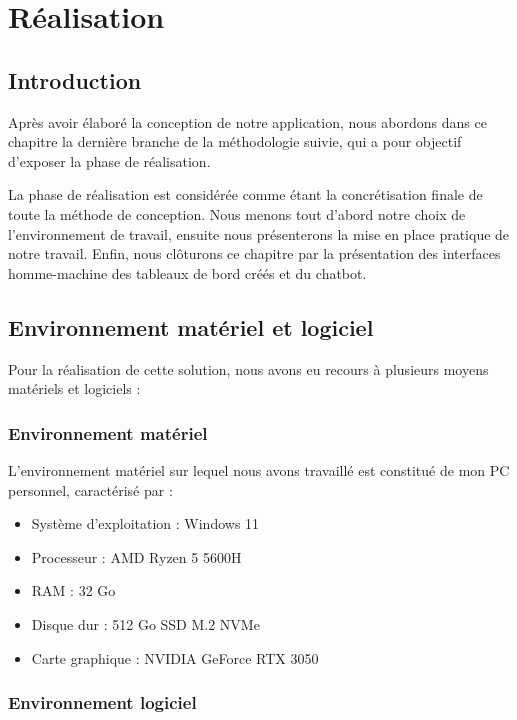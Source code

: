 \pagestyle{fancy}
\fancyhf{}

\chapter{ Réalisation }
\newpage
\section{Introduction}
Après avoir élaboré la conception de notre application, nous abordons dans ce chapitre la dernière branche de la méthodologie suivie, qui a pour objectif d'exposer la phase de réalisation.

La phase de réalisation est considérée comme étant la concrétisation finale de toute la méthode de conception. Nous menons tout d’abord notre choix de l’environnement de travail, ensuite nous présenterons la mise en place pratique de notre travail. Enfin, nous clôturons ce chapitre par la présentation des interfaces homme-machine des tableaux de bord créés et du chatbot.

\section{Environnement matériel et logiciel}

Pour la réalisation de cette solution, nous avons eu recours à plusieurs moyens matériels et logiciels :

\subsection{Environnement matériel}

L’environnement matériel sur lequel nous avons travaillé est constitué de mon PC personnel, caractérisé par :

\begin{itemize}
    \item Système d’exploitation : Windows 11
    \item Processeur : AMD Ryzen 5 5600H
    \item RAM : 32 Go
    \item Disque dur : 512 Go SSD M.2 NVMe
    \item Carte graphique : NVIDIA GeForce RTX 3050
\end{itemize}

\subsection{Environnement logiciel}

